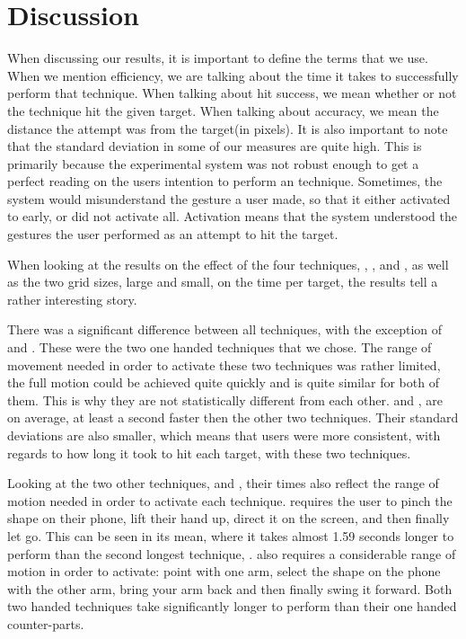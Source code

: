 \section{Discussion}
\label{sec:discussion}
When discussing our results, it is important to define the terms that we use.
When we mention efficiency, we are talking about the time it takes to successfully perform that technique.
When talking about hit success, we mean whether or not the technique hit the given target.
When talking about accuracy, we mean the distance the attempt was from the target(in pixels).
It is also important to note that the standard deviation in some of our measures are quite high.
This is primarily because the experimental system was not robust enough to get a perfect reading on the users intention to perform an technique.
Sometimes, the system would misunderstand the gesture a user made, so that it either activated to early, or did not activate all. 
Activation means that the system understood the gestures the user performed as an attempt to hit the target.

When looking at the results on the effect of the four techniques, \pinch, \swipe, \throw and \tilt, as well as the two grid sizes, large and small, on the time per target, the results tell a rather interesting story. 

There was a significant difference between all techniques, with the exception of \swipe and \tilt. These were the two one handed techniques that we chose. The range of movement needed in order to activate these two techniques was rather limited, the full motion could be achieved quite quickly and is quite similar for both of them. 
This is why they are not statistically different from each other. \swipe and \tilt, are on average, at least a second faster then the other two techniques.
Their standard deviations are also smaller, which means that users were more consistent, with regards to how long it took to hit each target, with these two techniques. 


Looking at the two other techniques, \pinch and \throw, their times also reflect the range of motion needed in order to activate each technique. \pinch requires the user to pinch the shape on their phone, lift their hand up, direct it on the screen, and then finally let go. This can be seen in its mean, where it takes almost 1.59 seconds longer to perform than the second longest technique, \throw. \throw also requires a considerable range of motion in order to activate: point with one arm, select the shape on the phone with the other arm, bring your arm back and then finally swing it forward. Both two handed techniques take significantly longer to perform than their one handed counter-parts.

